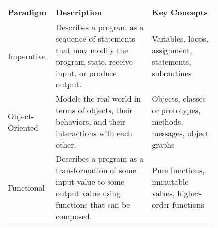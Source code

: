 \documentclass[10pt,twoside,openright]{memoir}
\begin{document}
\begin{figure}[H]
\caption{Comparison of JavaScript programming paradigms}
\begin{longtable}[]{@{}lll@{}}
\toprule
\begin{minipage}[b]{0.07\columnwidth}\raggedright
Paradigm\strut
\end{minipage} & \begin{minipage}[b]{0.55\columnwidth}\raggedright
Description\strut
\end{minipage} & \begin{minipage}[b]{0.30\columnwidth}\raggedright
Key Concepts\strut
\end{minipage}\tabularnewline
\midrule
\endhead
\begin{minipage}[t]{0.12\columnwidth}\raggedright
Imperative\strut
\end{minipage} & \begin{minipage}[t]{0.50\columnwidth}\raggedright
Describes a program as a sequence of statements that may modify the
program state, receive input, or produce output.\strut
\end{minipage} & \begin{minipage}[t]{0.30\columnwidth}\raggedright
Variables, loops, assignment, statements, subroutines\strut
\end{minipage}\tabularnewline
\begin{minipage}[t]{0.12\columnwidth}\raggedright
Object-Oriented\strut
\end{minipage} & \begin{minipage}[t]{0.50\columnwidth}\raggedright
Models the real world in terms of objects, their behaviors, and their
interactions with each other.\strut
\end{minipage} & \begin{minipage}[t]{0.30\columnwidth}\raggedright
Objects, classes or prototypes, methods, messages, object graphs\strut
\end{minipage}\tabularnewline
\begin{minipage}[t]{0.12\columnwidth}\raggedright
Functional\strut
\end{minipage} & \begin{minipage}[t]{0.50\columnwidth}\raggedright
Describes a program as a transformation of some input value to some
output value using functions that can be composed.\strut
\end{minipage} & \begin{minipage}[t]{0.30\columnwidth}\raggedright
Pure functions, immutable values, higher-order functions\strut
\end{minipage}\tabularnewline
\bottomrule
\end{longtable}
\end{figure}
\end{document}
